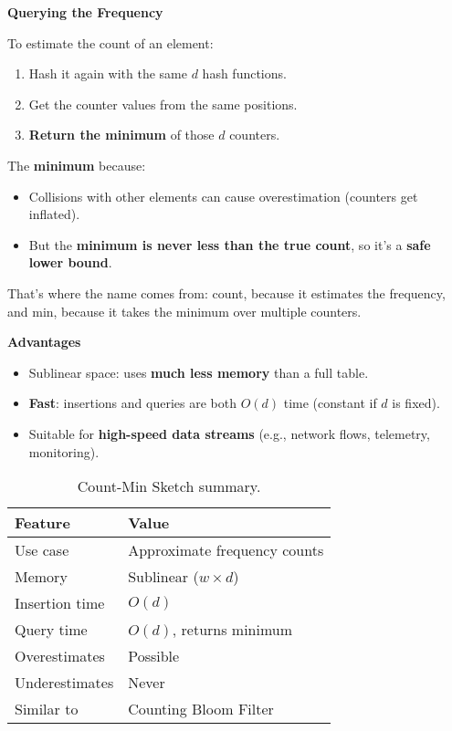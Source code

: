 \highspace
\begin{flushleft}
    \textcolor{Green3}{ \textbf{Querying the Frequency}}
\end{flushleft}
To estimate the count of an element:
\begin{enumerate}
    \item Hash it again with the same $d$ hash functions.
    \item Get the counter values from the same positions.
    \item \textbf{Return the minimum} of those $d$ counters.
\end{enumerate}
The \textbf{minimum} because:
\begin{itemize}
    \item Collisions with other elements can cause overestimation (counters get inflated).
    \item But the \textbf{minimum is never less than the true count}, so it's a \textbf{safe lower bound}.
\end{itemize}
That's where the name comes from: count, because it estimates the frequency, and min, because it takes the minimum over multiple counters.

\highspace
\begin{flushleft}
    \textcolor{Green3}{ \textbf{Advantages}}
\end{flushleft}
\begin{itemize}
    \item Sublinear space: uses \textbf{much less memory} than a full table.
    \item \textbf{Fast}: insertions and queries are both $O\left(d\right)$ time (constant if $d$ is fixed).
    \item Suitable for \textbf{high-speed data streams} (e.g., network flows, telemetry, monitoring).
\end{itemize}

\highspace
\begin{table}[!htp]
    \centering
    \begin{tabular}{@{} l | l @{}}
        \toprule
        \textbf{Feature} & \textbf{Value} \\
        \midrule
        Use case            & Approximate frequency counts \\ [.3em]
        Memory              & Sublinear ($ w \times d $)   \\ [.3em]
        Insertion time      & $ O(d) $                     \\ [.3em]
        Query time          & $ O(d) $, returns minimum    \\ [.3em]
        Overestimates       & Possible                     \\ [.3em]
        Underestimates      & Never                        \\ [.3em]
        Similar to          & Counting Bloom Filter        \\
        \bottomrule
    \end{tabular}
    \caption{Count-Min Sketch summary.}
\end{table}